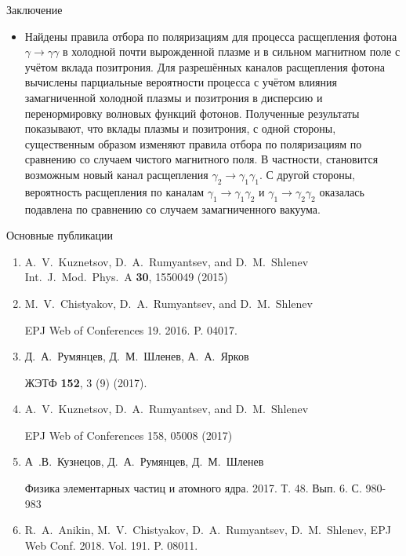 \documentclass{beamer}
\begin{document}
\begin{frame}{Заключение}
\begin{itemize}
\item Найдены правила отбора по поляризациям для 
процесса расщепления фотона $\gamma\to\gamma\gamma$ 
в холодной почти вырожденной плазме и в сильном магнитном поле с 
учётом вклада позитрония.
Для разрешённых каналов расщепления фотона вычислены 
парциальные вероятности процесса с учётом влияния 
замагниченной холодной плазмы и позитрония 
в дисперсию и перенормировку волновых 
функций фотонов. 
Полученные результаты показывают, 
что вклады плазмы и позитрония, с одной стороны, существенным 
образом изменяют правила отбора по поляризациям по 
сравнению со случаем чистого магнитного поля. 
В частности, становится возможным новый канал 
расщепления $\gamma_2\to\gamma_1 \gamma_1$.
С другой стороны, вероятность расщепления по каналам 
$\gamma_1\to\gamma_1 \gamma_2$ 
и $\gamma_1\to\gamma_2 \gamma_2$ оказалась подавлена
по сравнению со случаем замагниченного вакуума.

\end{itemize}
\end{frame}
\begin{frame}{Основные публикации}
% 
\begin{enumerate}
%
\item
   A.~V.~Kuznetsov, D.~A.~Rumyantsev, and  D.~M.~Shlenev 
   Int.~J.~Mod.~Phys.~A {\bf 30}, 1550049 (2015)
%
\item
  M.~V.~Chistyakov, D.~A.~Rumyantsev, and D.~M.~Shlenev
 
  EPJ Web of Conferences 19. 2016. P. 04017.
% 
\item
   Д.~А.~Румянцев, Д.~М.~Шленев, А.~А.~Ярков

   ЖЭТФ {\bf 152}, 3 (9) (2017).
%
\item
   A.~V.~Kuznetsov, D.~A.~Rumyantsev, and  D.~M.~Shlenev
 
   EPJ Web of Conferences 158, 05008 (2017)
%
\item
  А~.В.~Кузнецов, Д.~А.~Румянцев, Д.~М.~Шленев

  Физика элементарных частиц и атомного ядра. 2017. 
  Т. 48. Вып. 6. С. 980-983

\item R.~A.~Anikin, M.~V.~Chistyakov, D.~A.~Rumyantsev, D.~M.~Shlenev,
 EPJ Web Conf. 2018. Vol. 191. P. 08011.

\end{enumerate}
\end{frame}
\end{document}
